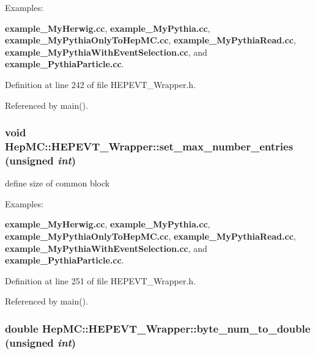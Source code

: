 \begin{Desc}
\item[Examples: ]\par
{\bf example\_\-My\-Herwig.cc}, {\bf example\_\-My\-Pythia.cc}, {\bf example\_\-My\-Pythia\-Only\-To\-Hep\-MC.cc}, {\bf example\_\-My\-Pythia\-Read.cc}, {\bf example\_\-My\-Pythia\-With\-Event\-Selection.cc}, and {\bf example\_\-Pythia\-Particle.cc}.\end{Desc}


Definition at line 242 of file HEPEVT\_\-Wrapper.h.

Referenced by main().
\subsubsection{\setlength{\rightskip}{0pt plus 5cm}void Hep\-MC::HEPEVT\_\-Wrapper::set\_\-max\_\-number\_\-entries (unsigned {\em int})\hspace{0.3cm}{\tt  [inline, static]}}\label{classHepMC_1_1HEPEVT__Wrapper_2488297e3a16692004190cab1a8236c7}


define size of common block 

\begin{Desc}
\item[Examples: ]\par
{\bf example\_\-My\-Herwig.cc}, {\bf example\_\-My\-Pythia.cc}, {\bf example\_\-My\-Pythia\-Only\-To\-Hep\-MC.cc}, {\bf example\_\-My\-Pythia\-Read.cc}, {\bf example\_\-My\-Pythia\-With\-Event\-Selection.cc}, and {\bf example\_\-Pythia\-Particle.cc}.\end{Desc}


Definition at line 251 of file HEPEVT\_\-Wrapper.h.

Referenced by main().
\subsubsection{\setlength{\rightskip}{0pt plus 5cm}double Hep\-MC::HEPEVT\_\-Wrapper::byte\_\-num\_\-to\_\-double (unsigned {\em int})\hspace{0.3cm}{\tt  [inline, static, protected]}}\label{classHepMC_1_1HEPEVT__Wrapper_fbb65ca73d5ac05fb366584e5e47a8e4}


